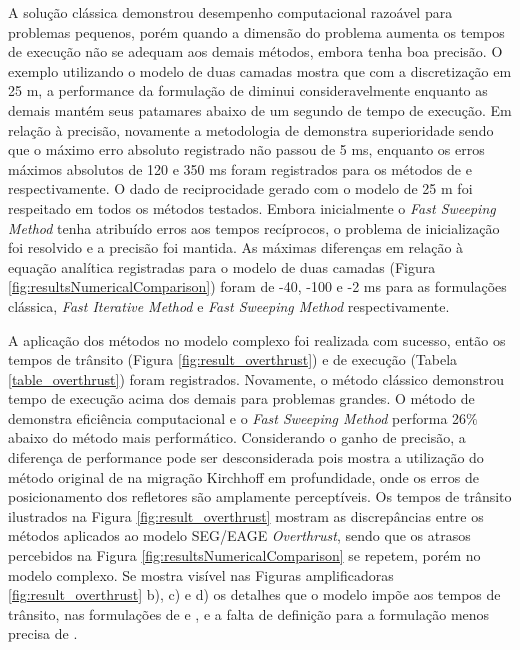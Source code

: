 A solução clássica demonstrou desempenho computacional razoável para problemas pequenos, porém quando a dimensão do problema aumenta os tempos de execução não se adequam aos demais métodos, embora tenha boa precisão. O exemplo utilizando o modelo de duas camadas mostra que com a discretização em 25 m, a performance da formulação de  diminui consideravelmente enquanto as demais mantém seus patamares abaixo de um segundo de tempo de execução. Em relação à precisão, novamente a metodologia de  demonstra superioridade sendo que o máximo erro absoluto registrado não passou de 5 ms, enquanto os erros máximos absolutos de 120 e 350 ms foram registrados para os métodos de  e  respectivamente. O dado de reciprocidade gerado com o modelo de 25 m foi respeitado em todos os métodos testados. Embora inicialmente o \textit{Fast Sweeping Method} tenha atribuído erros aos tempos recíprocos, o problema de inicialização foi resolvido e a precisão foi mantida. As máximas diferenças em relação à equação analítica registradas para o modelo de duas camadas (Figura \ref{fig:resultsNumericalComparison}) foram de -40, -100 e -2 ms para as formulações clássica, \textit{Fast Iterative Method} e \textit{Fast Sweeping Method} respectivamente.         

A aplicação dos métodos no modelo complexo foi realizada com sucesso, então os tempos de trânsito (Figura \ref{fig:result_overthrust}) e de execução (Tabela \ref{table_overthrust}) foram registrados. Novamente, o método clássico demonstrou tempo de execução acima dos demais para problemas grandes. O método de \cite{jeong2008fast} demonstra eficiência computacional e o \textit{Fast Sweeping Method} performa 26$\%$ abaixo do método mais performático. Considerando o ganho de precisão, a diferença de performance pode ser desconsiderada pois  mostra a utilização do método original de  na migração Kirchhoff em profundidade, onde os erros de posicionamento dos refletores são amplamente perceptíveis.  Os tempos de trânsito ilustrados na Figura \ref{fig:result_overthrust} mostram as discrepâncias entre os métodos aplicados ao modelo SEG/EAGE \textit{Overthrust}, sendo que os atrasos percebidos na Figura \ref{fig:resultsNumericalComparison} se repetem, porém no modelo complexo. Se mostra visível nas Figuras amplificadoras \ref{fig:result_overthrust} b), c) e d) os detalhes que o modelo impõe aos tempos de trânsito, nas formulações de  e , e a falta de definição para a formulação menos precisa de .  
 
